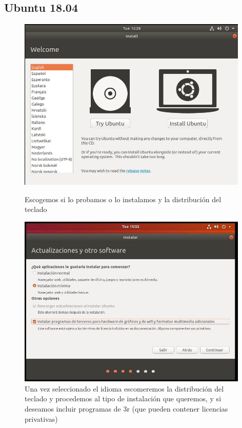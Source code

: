 \documentclass[preprint,11pt]{elsarticle}
\begin{document}
\subsection{Ubuntu 18.04}
\begin{figure}[!htbp]
    \begin{center}
        \includegraphics[width=11cm]{anex/ubuntu1.JPG}
    \end{center}
    \caption{Escogemos si lo probamos o lo instalamos y la distribución del teclado}
    \begin{center}
        \includegraphics[width=11cm]{anex/ubuntu2.JPG}
    \end{center}
    \caption{Una vez seleccionado el idioma escomeremos la distribución del teclado y procedemos al tipo de instalación que queremos, y si deseamos incluir programas de 3r (que pueden contener licencias privativas)}
\end{figure}
\end{document}
